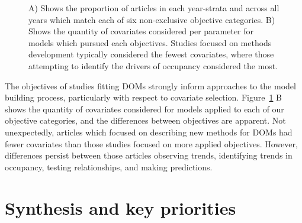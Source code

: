 \documentclass[
]{article}
\begin{document}
\begin{figure}


\caption{\label{fig-objectives}A) Shows the proportion of articles in
each year-strata and across all years which match each of six
non-exclusive objective categories. B) Shows the quantity of covariates
considered per parameter for models which pursued each objectives.
Studies focused on methods development typically considered the fewest
covariates, where those attempting to identify the drivers of occupancy
considered the most.}

\end{figure}%

The objectives of studies fitting DOMs strongly inform approaches to the
model building process, particularly with respect to covariate
selection. Figure~\ref{fig-objectives} B shows the quantity of
covariates considered for models applied to each of our objective
categories, and the differences between objectives are apparent. Not
unexpectedly, articles which focused on describing new methods for DOMs
had fewer covariates than those studies focused on more applied
objectives. However, differences persist between those articles
observing trends, identifying trends in occupancy, testing
relationships, and making predictions.

\section{Synthesis and key
priorities}\label{synthesis-and-key-priorities}
\end{document}
